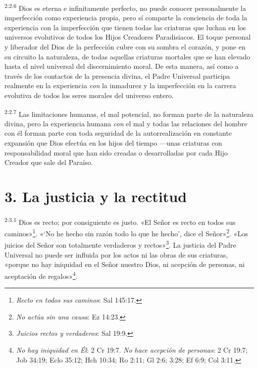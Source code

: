 \par
\textsuperscript{2:2.6} Dios es eterna e infinitamente perfecto, no puede conocer personalmente la imperfección como experiencia propia, pero sí comparte la conciencia de toda la experiencia con la imperfección que tienen todas las criaturas que luchan en los universos evolutivos de todos los Hijos Creadores Paradisiacos. El toque personal y liberador del Dios de la perfección cubre con su sombra el corazón, y pone en su circuito la naturaleza, de todas aquellas criaturas mortales que se han elevado hasta el nivel universal del discernimiento moral. De esta manera, así como a través de los contactos de la presencia divina, el Padre Universal participa realmente en la experiencia \textit{con} la inmadurez y la imperfección en la carrera evolutiva de todos los seres morales del universo entero.

\par
\textsuperscript{2:2.7} Las limitaciones humanas, el mal potencial, no forman parte de la naturaleza divina, pero la experiencia humana \textit{con} el mal y todas las relaciones del hombre con él forman parte con toda seguridad de la autorrealización en constante expansión que Dios efectúa en los hijos del tiempo ---unas criaturas con responsabilidad moral que han sido creadas o desarrolladas por cada Hijo Creador que sale del Paraíso.

\section*{3. La justicia y la rectitud}
\par
\textsuperscript{2:3.1} Dios es recto; por consiguiente es justo. «El Señor es recto en todos sus caminos»\footnote{\textit{Recto en todos sus caminos}: Sal 145:17.}. «`No he hecho sin razón todo lo que he hecho', dice el Señor»\footnote{\textit{No actúa sin una causa}: Ez 14:23.}. «Los juicios del Señor son totalmente verdaderos y rectos»\footnote{\textit{Juicios rectos y verdaderos}: Sal 19:9.}. La justicia del Padre Universal no puede ser influida por los actos ni las obras de sus criaturas, «porque no hay iniquidad en el Señor nuestro Dios, ni acepción de personas, ni aceptación de regalos»\footnote{\textit{No hay iniquidad en Él}: 2 Cr 19:7. \textit{No hace acepción de personas}: 2 Cr 19:7; Job 34:19; Eclo 35:12; Hch 10:34; Ro 2:11; Gl 2:6; 3:28; Ef 6:9; Col 3:11.}.

